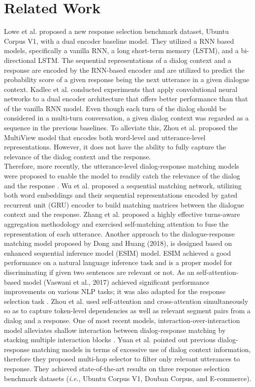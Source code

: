 \documentclass[a4paper]{article}
\begin{document}
 \section{Related Work}
Lowe et al. \cite{lowe2015ubuntu} proposed a new response selection benchmark dataset, Ubuntu Corpus V1, with a dual encoder baseline model. They utilized a RNN based models, specifically a vanilla RNN, a long short-term memory (LSTM), and a bi-directional LSTM. The sequential representations of a dialog context and a response are encoded by the RNN-based encoder and are utilized to predict the probability score of a given response being the next utterance in a given dialogue context. Kadlec et al. \cite{kadlec2015improved} conducted experiments that apply convolutional neural networks to a dual encoder architecture that offers better performance than that of the vanilla RNN model. Even though each turn of the dialog should be considered in a multi-turn conversation, a given dialog context was regarded as a sequence in the previous baselines. To alleviate this, Zhou et al. \cite{zhou2016multi} proposed the MultiView model that encodes both word-level and utterance-level representations. However, it does not have the ability to fully capture the relevance of the dialog context and the response. \\
\indent Therefore, more recently, the utterance-level dialog-response matching models were proposed to enable the model to readily catch the relevance of the dialog and the response \cite{wu2017sequential,zhang2018dua}. Wu et al. \cite{wu2017sequential} proposed a sequential matching network, utilizing both word embeddings and their sequential representations encoded by gated recurrent unit (GRU) encoder to build matching matrices between the dialogue context and the response. Zhang et al. \cite{zhang2018dua} proposed a highly effective turns-aware aggregation methodology and exercised self-matching attention to fuse the representation of each utterance. Another approach to the dialogue-response matching model proposed by Dong and Huang (2018), is designed based on enhanced sequential inference model (ESIM) \cite{chen2017enhanced} model. ESIM achieved a good performance on a natural language inference task and is a proper model for discriminating if given two sentences are relevant or not. As an self-attention-based model (Vaswani et al., 2017) achieved significant performance improvements on various NLP tasks; it was also adapted for the response selection task \cite{zhou2018multi,tao2019one,yuan2019multi}. Zhou et al. \cite{zhou2018multi} used self-attention and cross-attention simultaneously so as to capture token-level dependencies as well as relevant segment pairs from a dialog and a response. One of most recent models, interaction-over-interaction model alleviates shallow interaction between dialog-response matching by stacking multiple interaction blocks \cite{tao2019multi}. Yuan et al. \cite{yuan2019multi} pointed out previous dialog-response matching models in terms of excessive use of dialog context information, therefore they proposed multi-hop selector to filter only relevant utterances to response. They achieved state-of-the-art results on three response selection benchmark datasets ({\em{i.e.,}} Ubuntu Corpus V1, Douban Corpus, and E-commerce).
\end{document}
